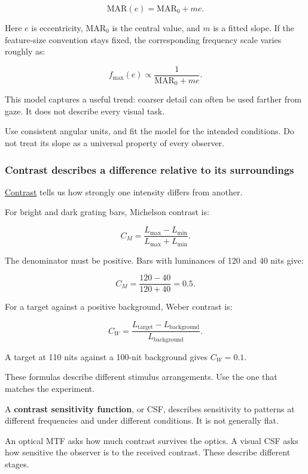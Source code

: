 \[
\mathrm{MAR}(e)=\mathrm{MAR}_0+me.
\]

Here \(e\) is eccentricity, \(\mathrm{MAR}_0\) is the central value, and \(m\) is a fitted slope. If the feature-size convention stays fixed, the corresponding frequency scale varies roughly as:

\[
f_{\max}(e)\propto\frac1{\mathrm{MAR}_0+me}.
\]

This model captures a useful trend: coarser detail can often be used farther from gaze. It does not describe every visual task.

Use consistent angular units, and fit the model for the intended conditions. Do not treat its slope as a universal property of every observer.

\subsubsection{Contrast describes a difference relative to its surroundings}\label{04-visual-computing-ii-ch042-contrast-describes-a-difference-relative-to-its-surroundings}

\hypertarget{04-visual-computing-ii-ch042-contrast-describes-a-difference-relative-to-its-surroundings}{}

\hyperref[appendix-b3aa9e8e01ad]{Contrast} tells us how strongly one intensity differs from another.

For bright and dark grating bars, Michelson contrast is:

\[
C_M=\frac{L_{\max}-L_{\min}}{L_{\max}+L_{\min}}.
\]

The denominator must be positive. Bars with luminances of 120 and 40 nits give:

\[
C_M=\frac{120-40}{120+40}=0.5.
\]

For a target against a positive background, Weber contrast is:

\[
C_W=\frac{L_{\mathrm{target}}-L_{\mathrm{background}}}
{L_{\mathrm{background}}}.
\]

A target at 110 nits against a 100-nit background gives \(C_W=0.1\).

These formulas describe different stimulus arrangements. Use the one that matches the experiment.

A \textbf{contrast sensitivity function}, or CSF, describes sensitivity to patterns at different frequencies and under different conditions. It is not generally flat.

An optical MTF asks how much contrast survives the optics. A visual CSF asks how sensitive the observer is to the received contrast. These describe different stages.

